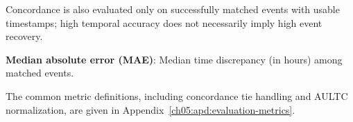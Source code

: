 Concordance is also evaluated only on successfully matched events with usable timestamps; high temporal accuracy does not necessarily imply high event recovery.

\textbf{Median absolute error (MAE)}: Median time discrepancy (in hours) among matched events.

The common metric definitions, including concordance tie handling and AULTC normalization, are given in Appendix~\ref{ch05:apd:evaluation-metrics}.


